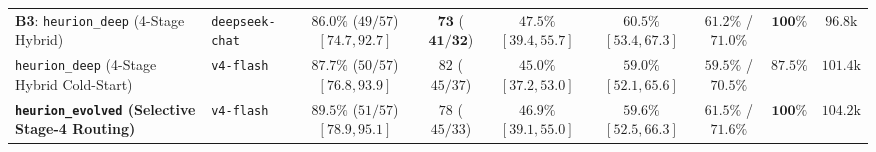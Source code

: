 \documentclass[11pt,a4paper]{article}
\begin{document}
\begin{table}[!t]
{\begin{tabular}{@{}llccccccc@{}}
\midrule
\textbf{B3}: \texttt{heurion\_deep} (4-Stage Hybrid) & \texttt{deepseek-chat} & $86.0\%$ ($49/57$) $[74.7, 92.7]$ & $\mathbf{73}$ ($\mathbf{41}/\mathbf{32}$) & $\mathbf{47.5\%}$ $[39.4, 55.7]$ & $\mathbf{60.5\%}$ $[53.4, 67.3]$ & $61.2\%$ / $71.0\%$ & $\mathbf{100\%}$ & $96.8\text{k}$ \\
\texttt{heurion\_deep} (4-Stage Hybrid Cold-Start) & \texttt{v4-flash} & $87.7\%$ ($50/57$) $[76.8, 93.9]$ & $82$ ($45/37$) & $45.0\%$ $[37.2, 53.0]$ & $59.0\%$ $[52.1, 65.6]$ & $59.5\%$ / $70.5\%$ & $87.5\%$ & $101.4\text{k}$ \\
\textbf{\texttt{heurion\_evolved} (Selective Stage-4 Routing)} & \texttt{v4-flash} & $\mathbf{89.5\%}$ ($51/57$) $[78.9, 95.1]$ & $78$ ($45/33$) & $46.9\%$ $[39.1, 55.0]$ & $59.6\%$ $[52.5, 66.3]$ & $\mathbf{61.5\%}$ / $71.6\%$ & $\mathbf{100\%}$ & $104.2\text{k}$ \\
\bottomrule
\end{tabular}
}
\end{table}
\end{document}

